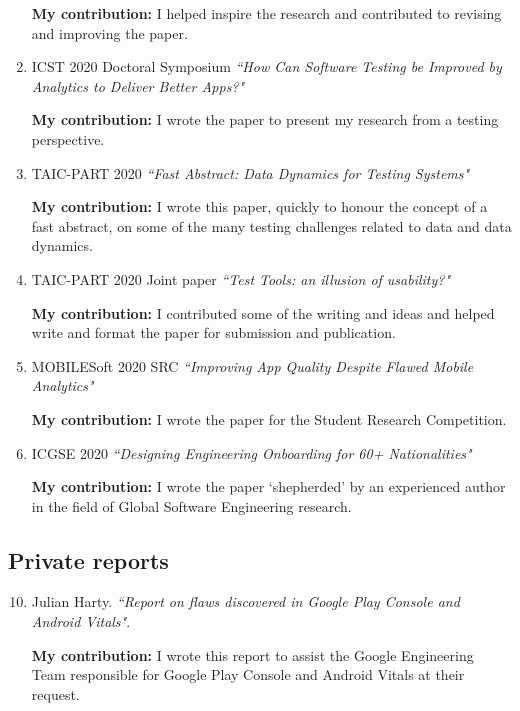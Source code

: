\begin{enumerate}
    \textbf{My contribution:} I helped inspire the research and contributed to revising and improving the paper.
    
    \item ICST 2020 Doctoral Symposium \emph{``How Can Software Testing be Improved by Analytics to Deliver Better Apps?"}
    
    \textbf{My contribution:} I wrote the paper to present my research from a testing perspective.
    
    \item TAIC-PART 2020 \emph{``Fast Abstract: Data Dynamics for Testing Systems"}
    
    \textbf{My contribution:} I wrote this paper, quickly to honour the concept of a fast abstract, on some of the many testing challenges related to data and data dynamics.
    
    \item TAIC-PART 2020 Joint paper \emph{``Test Tools: an illusion of usability?"}
    
    \textbf{My contribution:} I contributed some of the writing and ideas and helped write and format the paper for submission and publication. 
    
    \item MOBILESoft 2020 SRC \emph{``Improving App Quality Despite Flawed Mobile Analytics"}
    
    \textbf{My contribution:} I wrote the paper for the Student Research Competition.
    
    \item ICGSE 2020 \emph{``Designing Engineering Onboarding for 60+ Nationalities"}
    
    \textbf{My contribution:} I wrote the paper `shepherded' by an experienced author in the field of Global Software Engineering research.
    
\end{enumerate}

\subsection{Private reports}
\begin{enumerate}

    \setcounter{enumi}{9}
    \item Julian Harty. \emph{``Report on flaws discovered in Google Play Console and Android Vitals"}.
    
    \textbf{My contribution:} I wrote this report to assist the Google Engineering Team responsible for Google Play Console and Android Vitals at their request.

\end{enumerate}

